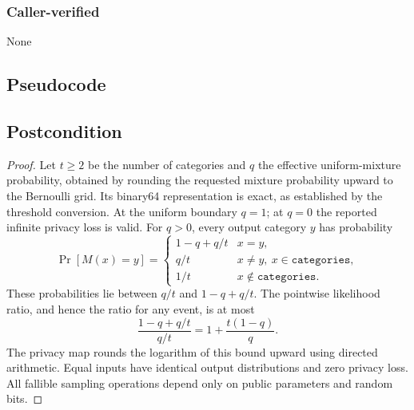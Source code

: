 \documentclass{article}
\begin{document}
\subsubsection*{Caller-verified}
None

\subsection*{Pseudocode}


\subsection*{Postcondition}
\begin{theorem}
\end{theorem}
\begin{proof}
    Let $t\geq 2$ be the number of categories and $q$ the effective uniform-mixture probability, obtained by rounding the requested mixture probability upward to the Bernoulli grid.
    Its binary64 representation is exact, as established by the threshold conversion.
    At the uniform boundary $q=1$; at $q=0$ the reported infinite privacy loss is valid.
    For $q>0$, every output category $y$ has probability
    \[
        \Pr[M(x)=y]=
        \begin{cases}
            1-q+q/t & x=y,\\
            q/t & x\ne y,\ x\in\texttt{categories},\\
            1/t & x\notin\texttt{categories}.
        \end{cases}
    \]
    These probabilities lie between $q/t$ and $1-q+q/t$.
    The pointwise likelihood ratio, and hence the ratio for any event, is at most
    \[
        \frac{1-q+q/t}{q/t}=1+\frac{t(1-q)}q.
    \]
    The privacy map rounds the logarithm of this bound upward using directed arithmetic.
    Equal inputs have identical output distributions and zero privacy loss.
    All fallible sampling operations depend only on public parameters and random bits.
\end{proof}



\end{document}
